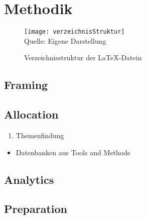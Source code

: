 \newpage
\section{Methodik} \label{sec: Methodik}

\begin{figure}[H]
    \caption{Verzeichnisstruktur der \LaTeX{}-Datein}\label{fig:verzeichnisStruktur}
    \texttt{[image: verzeichnisStruktur]}
    \\
    Quelle: Eigene Darstellung
\end{figure}

\subsection{Framing} \label{sec: t_Framing}

\subsection{Allocation} \label{sec: t_Allocation}

\begin{enumerate}
\item Themenfindung
\end{enumerate}

\begin{itemize}
\item Datenbanken aus Tools and Methods
\end{itemize}

\subsection{Analytics} \label{sec: t_Analytics}

\subsection{Preparation} \label{sec: t_Preparation}

